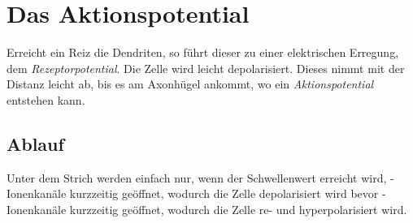 \documentclass{article}
\begin{document}
\section{Das Aktionspotential}
Erreicht ein Reiz die Dendriten, so führt dieser zu einer elektrischen Erregung, dem \emph{Rezeptorpotential}. Die Zelle wird leicht depolarisiert. Dieses nimmt mit der Distanz leicht ab, bis es am Axonhügel ankommt, wo ein \emph{Aktionspotential} entstehen kann.
 
\subsection{Ablauf}
Unter dem Strich werden einfach nur, wenn der Schwellenwert erreicht wird, -Ionenkanäle kurzzeitig geöffnet, wodurch die Zelle depolarisiert wird bevor -Ionenkanäle kurzzeitig geöffnet, wodurch die Zelle re- und hyperpolarisiert wird.
 
\end{document}
